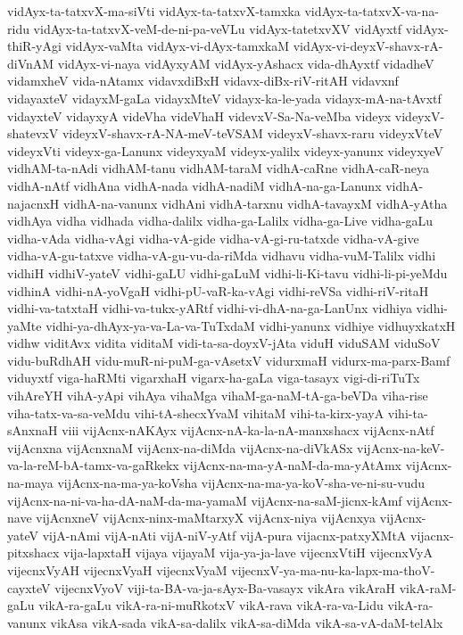 {vidAyx-ta-tatxvX-ma-siVti
vidAyx-ta-tatxvX-tamxka
vidAyx-ta-tatxvX-va-na-ridu
vidAyx-ta-tatxvX-veM-de-ni-pa-veVLu
vidAyx-tatetxvXV
vidAyxtf
vidAyx-thiR-yAgi
vidAyx-vaMta
vidAyx-vi-dAyx-tamxkaM
vidAyx-vi-deyxV-shavx-rA-diVnAM
vidAyx-vi-naya
vidAyxyAM
vidAyx-yAshacx
vida-dhAyxtf
vidadheV
vidamxheV
vida-nAtamx
vidavxdiBxH
vidavx-diBx-riV-ritAH
vidavxnf
vidayaxteV
vidayxM-gaLa
vidayxMteV
vidayx-ka-le-yada
vidayx-mA-na-tAvxtf
vidayxteV
vidayxyA
videVha
videVhaH
videvxV-Sa-Na-veMba
videyx
videyxV-shatevxV
videyxV-shavx-rA-NA-meV-teVSAM
videyxV-shavx-raru
videyxVteV
videyxVti
videyx-ga-Lanunx
videyxyaM
videyx-yalilx
videyx-yanunx
videyxyeV
vidhAM-ta-nAdi
vidhAM-tanu
vidhAM-taraM
vidhA-caRne
vidhA-caR-neya
vidhA-nAtf
vidhAna
vidhA-nada
vidhA-nadiM
vidhA-na-ga-Lanunx
vidhA-najacnxH
vidhA-na-vanunx
vidhAni
vidhA-tarxnu
vidhA-tavayxM
vidhA-yAtha
vidhAya
vidha
vidhada
vidha-dalilx
vidha-ga-Lalilx
vidha-ga-Live
vidha-gaLu
vidha-vAda
vidha-vAgi
vidha-vA-gide
vidha-vA-gi-ru-tatxde
vidha-vA-give
vidha-vA-gu-tatxve
vidha-vA-gu-vu-da-riMda
vidhavu
vidha-vuM-Talilx
vidhi
vidhiH
vidhiV-yateV
vidhi-gaLU
vidhi-gaLuM
vidhi-li-Ki-tavu
vidhi-li-pi-yeMdu
vidhinA
vidhi-nA-yoVgaH
vidhi-pU-vaR-ka-vAgi
vidhi-reVSa
vidhi-riV-ritaH
vidhi-va-tatxtaH
vidhi-va-tukx-yARtf
vidhi-vi-dhA-na-ga-LanUnx
vidhiya
vidhi-yaMte
vidhi-ya-dhAyx-ya-va-La-va-TuTxdaM
vidhi-yanunx
vidhiye
vidhuyxkatxH
vidhw
viditAvx
vidita
viditaM
vidi-ta-sa-doyxV-jAta
viduH
viduSAM
viduSoV
vidu-buRdhAH
vidu-muR-ni-puM-ga-vAsetxV
vidurxmaH
vidurx-ma-parx-Bamf
viduyxtf
viga-haRMti
vigarxhaH
vigarx-ha-gaLa
viga-tasayx
vigi-di-riTuTx
vihAreYH
vihA-yApi
vihAya
vihaMga
vihaM-ga-naM-tA-ga-beVDa
viha-rise
viha-tatx-va-sa-veMdu
vihi-tA-shecxYvaM
vihitaM
vihi-ta-kirx-yayA
vihi-ta-sAnxnaH
viii
vijAcnx-nAKAyx
vijAcnx-nA-ka-la-nA-manxshacx
vijAcnx-nAtf
vijAcnxna
vijAcnxnaM
vijAcnx-na-diMda
vijAcnx-na-diVkASx
vijAcnx-na-keV-va-la-reM-bA-tamx-va-gaRkekx
vijAcnx-na-ma-yA-naM-da-ma-yAtAmx
vijAcnx-na-maya
vijAcnx-na-ma-ya-koVsha
vijAcnx-na-ma-ya-koV-sha-ve-ni-su-vudu
vijAcnx-na-ni-va-ha-dA-naM-da-ma-yamaM
vijAcnx-na-saM-jicnx-kAmf
vijAcnx-nave
vijAcnxneV
vijAcnx-ninx-maMtarxyX
vijAcnx-niya
vijAcnxya
vijAcnx-yateV
vijA-nAmi
vijA-nAti
vijA-niV-yAtf
vijA-pura
vijacnx-patxyXMtA
vijacnx-pitxshacx
vija-lapxtaH
vijaya
vijayaM
vija-ya-ja-lave
vijecnxVtiH
vijecnxVyA
vijecnxVyAH
vijecnxVyaH
vijecnxVyaM
vijecnxV-ya-ma-nu-ka-lapx-ma-thoV-cayxteV
vijecnxVyoV
viji-ta-BA-va-ja-sAyx-Ba-vasayx
vikAra
vikAraH
vikA-raM-gaLu
vikA-ra-gaLu
vikA-ra-ni-muRkotxV
vikA-rava
vikA-ra-va-Lidu
vikA-ra-vanunx
vikAsa
vikA-sada
vikA-sa-dalilx
vikA-sa-diMda
vikA-sa-vA-daM-telAlx
}
